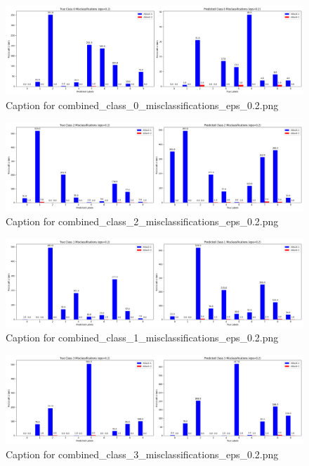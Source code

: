 \documentclass[11pt,onside]{article}
\begin{document}
\begin{figure}[ht]
\centering
\includegraphics[width=1\textwidth]{combined_class_boundary_pgd/combined_class_0_misclassifications_eps_0.2.png}
\caption{Caption for combined_class_0_misclassifications_eps_0.2.png}
\label{fig:combined_class_0_misclassifications_eps_0.2.png}
\end{figure}

\begin{figure}[ht]
\centering
\includegraphics[width=1\textwidth]{combined_class_boundary_pgd/combined_class_2_misclassifications_eps_0.2.png}
\caption{Caption for combined_class_2_misclassifications_eps_0.2.png}
\label{fig:combined_class_2_misclassifications_eps_0.2.png}
\end{figure}

\begin{figure}[ht]
\centering
\includegraphics[width=1\textwidth]{combined_class_boundary_pgd/combined_class_1_misclassifications_eps_0.2.png}
\caption{Caption for combined_class_1_misclassifications_eps_0.2.png}
\label{fig:combined_class_1_misclassifications_eps_0.2.png}
\end{figure}

\begin{figure}[ht]
\centering
\includegraphics[width=1\textwidth]{combined_class_boundary_pgd/combined_class_3_misclassifications_eps_0.2.png}
\caption{Caption for combined_class_3_misclassifications_eps_0.2.png}
\label{fig:combined_class_3_misclassifications_eps_0.2.png}
\end{figure}
\end{document}
